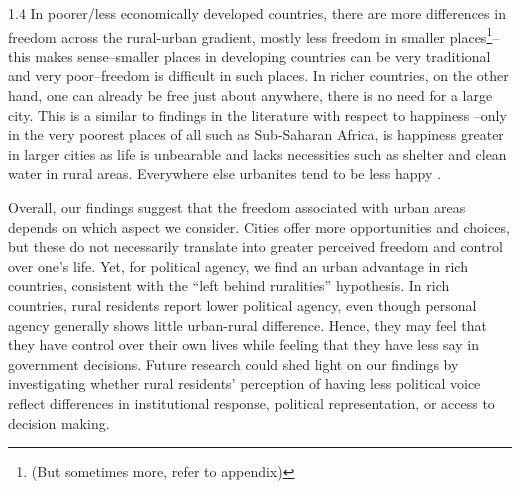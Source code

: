 \documentclass[10pt, letterpaper]{article}
\begin{document}
\begin{spacing}{1.4}
In poorer/less economically developed countries, there are more differences in freedom across the rural-urban gradient, mostly less freedom in smaller places\footnote{(But sometimes more, refer to appendix)}--this makes sense--smaller places in developing countries can be very traditional and very poor--freedom is difficult in such places. In richer countries, on the other hand, one can already be free just about anywhere, there is no need for a large city. This is a similar to findings in the literature with respect to happiness \citep{aokCityBook15}--only in the very poorest places of all such as Sub-Saharan Africa, is happiness greater in larger cities as life is unbearable and lacks necessities such as shelter and clean water in rural areas. Everywhere else urbanites tend to be less happy \citep{aok21}.

Overall, our findings suggest that the freedom associated with urban areas depends on which aspect we consider. Cities offer more opportunities and choices, but these do not necessarily translate into greater perceived freedom and control over one's life. Yet, for political agency, we find an urban advantage in rich countries, consistent with the ``left behind ruralities'' hypothesis. In rich countries, rural residents report lower political agency, even though personal agency generally shows little urban-rural difference. Hence, they may feel that they have control over their own lives while feeling that they have less say in government decisions. Future research could shed light on our findings by investigating whether rural residents' perception of having less political voice reflect differences in institutional response, political representation, or access to decision making.


 



\end{spacing}
\end{document}
